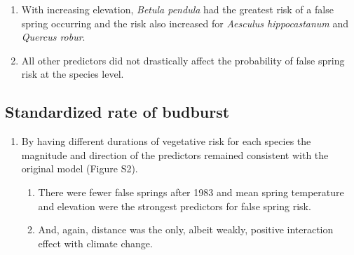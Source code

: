 \documentclass{article}\usepackage[]{graphicx}\usepackage[]{color}
\begin{document}
\begin{enumerate}
\begin{enumerate}
  \item With increasing elevation, \textit{Betula pendula} had the greatest risk of a false spring occurring and the risk also increased for \textit{Aesculus hippocastanum} and \textit{Quercus robur}. 
  \item All other predictors did not drastically affect the probability of false spring risk at the species level.
\end{enumerate}
\end{enumerate}

\subsection*{Standardized rate of budburst}
\begin{enumerate}

\item By having different durations of vegetative risk for each species the magnitude and direction of the predictors remained consistent with the original model (Figure S2). %
  \begin{enumerate}
  \item There were fewer false springs after 1983 and mean spring temperature and elevation were the strongest predictors for false spring risk. 
  \item And, again, distance was the only, albeit weakly, positive interaction effect with climate change. 
  \end{enumerate}

\end{enumerate}  
  
  
\end{document}
